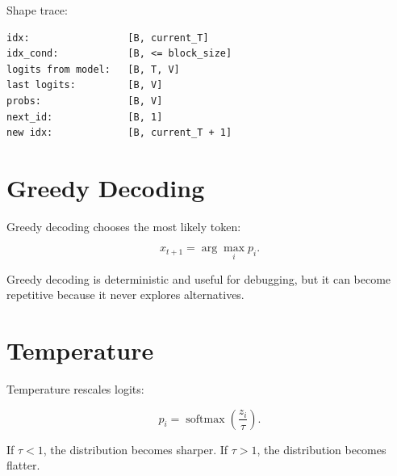Shape trace:

\begin{lstlisting}
idx:                 [B, current_T]
idx_cond:            [B, <= block_size]
logits from model:   [B, T, V]
last logits:         [B, V]
probs:               [B, V]
next_id:             [B, 1]
new idx:             [B, current_T + 1]
\end{lstlisting}

\section{Greedy Decoding}

Greedy decoding chooses the most likely token:

\[
x_{t+1}=\arg\max_i p_i.
\]

\begin{center}
\end{center}

Greedy decoding is deterministic and useful for debugging, but it can become repetitive because it never explores alternatives.

\section{Temperature}

Temperature rescales logits:

\[
p_i=\operatorname{softmax}\left(\frac{z_i}{\tau}\right).
\]

If \(\tau<1\), the distribution becomes sharper. If \(\tau>1\), the distribution becomes flatter.

